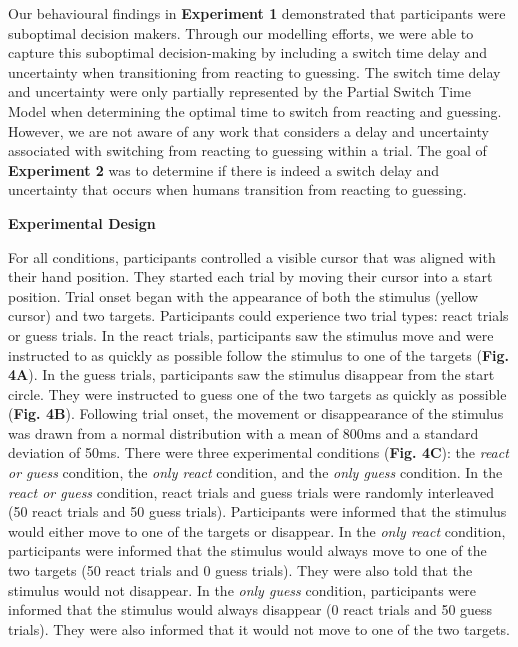 \documentclass[12pt]{article}
\newcommand\boldblue[1]{\textcolor{mydarkblue}{\textbf{#1}}}
\begin{document}
\noindent Our behavioural findings in \boldblue{Experiment 1} demonstrated that participants were suboptimal decision makers. Through our modelling efforts, we were able to capture this suboptimal decision-making by including a switch time delay and uncertainty when transitioning from reacting to guessing. The switch time delay and uncertainty were only partially represented by the Partial Switch Time Model when determining the optimal time to switch from reacting and guessing. However, we are not aware of any work that considers a delay and uncertainty associated with switching from reacting to guessing within a trial. The goal of \boldblue{Experiment 2} was to determine if there is indeed a switch delay and uncertainty that occurs when humans transition from reacting to guessing.

\noindent \boldblue{Experimental Design}

\noindent For all conditions, participants controlled a visible cursor that was aligned with their hand position. They started each trial by moving their cursor into a start position. Trial onset began with the appearance of both the stimulus (yellow cursor) and two targets. Participants could experience two trial types: react trials or guess trials. In the react trials, participants saw the stimulus move and were instructed to as quickly as possible follow the stimulus to one of the targets (\boldblue{Fig. 4A}). In the guess trials, participants saw the stimulus disappear from the start circle. They were instructed to guess one of the two targets as quickly as possible (\boldblue{Fig. 4B}). Following trial onset, the movement or disappearance of the stimulus was drawn from a normal distribution with a mean of 800ms and a standard deviation of 50ms. There were three experimental conditions (\boldblue{Fig. 4C}): the \emph{react or guess} condition, the \emph{only react} condition, and the \emph{only guess} condition. In the \emph{react or guess} condition, react trials and guess trials were randomly interleaved (50 react trials and 50 guess trials). Participants were informed that the stimulus would either move to one of the targets or disappear. In the \emph{only react} condition, participants were informed that the stimulus would always move to one of the two targets (50 react trials and 0 guess trials). They were also told that the stimulus would not disappear. In the \emph{only guess} condition, participants were informed that the stimulus would always disappear (0 react trials and 50 guess trials). They were also informed that it would not move to one of the two targets.
\end{document}
